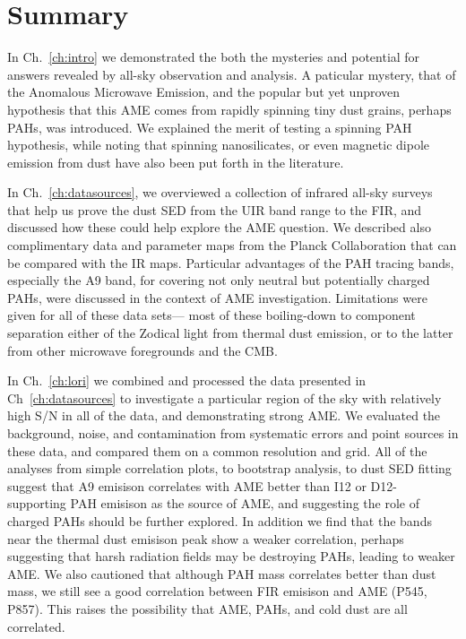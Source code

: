 \chapter{Summary}
  \label{ch:Summary}

  In Ch.~\ref{ch:intro} we demonstrated the both the mysteries and potential for answers revealed by all-sky observation and analysis. A paticular mystery, that of the Anomalous Microwave Emission, and the popular but yet unproven hypothesis that this AME comes from rapidly spinning tiny dust grains, perhaps PAHs, was introduced. We explained the merit of testing a spinning PAH hypothesis, while noting that spinning nanosilicates, or even magnetic dipole emission from dust have also been put forth in the literature.

  In Ch.~\ref{ch:datasources}, we overviewed a collection of infrared all-sky surveys that help us prove the dust SED from the UIR band range to the FIR, and discussed how these could help explore the AME question. We described also complimentary data and parameter maps from the Planck Collaboration that can be compared with the IR maps. Particular advantages of the PAH tracing bands, especially the A9 band, for covering not only neutral but potentially charged PAHs, were discussed in the context of AME investigation. Limitations were given for all of these data sets--- most of these boiling-down to component separation either of the Zodical light from thermal dust emission, or to the latter from other microwave foregrounds and the CMB.

  In Ch.~\ref{ch:lori} we combined and processed the data presented in Ch~\ref{ch:datasources} to investigate a particular region of the sky with relatively high S/N in all of the data, and demonstrating strong AME. We evaluated the background, noise, and contamination from systematic errors and point sources in these data, and compared them on a common resolution and grid. All of the analyses from simple correlation plots, to bootstrap analysis, to dust SED fitting suggest that A9 emisison correlates with AME better than I12 or D12- supporting PAH emisison as the source of AME, and suggesting the role of charged PAHs should be further explored. In addition we find that the bands near the thermal dust emisison peak show a weaker correlation, perhaps suggesting that harsh radiation fields may be destroying PAHs, leading to weaker AME. We also cautioned that although PAH mass correlates better than dust mass, we still see a good correlation between FIR emisison and AME (P545, P857). This raises the possibility that AME, PAHs, and cold dust are all correlated.

